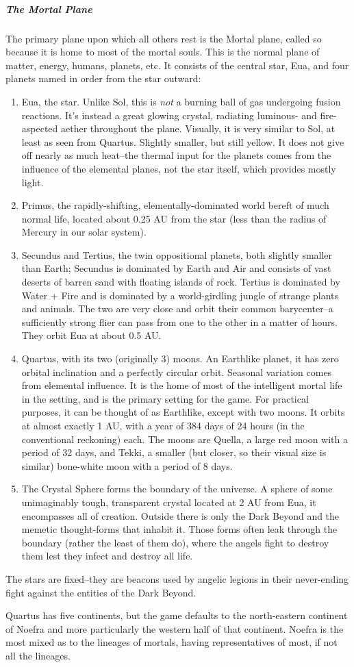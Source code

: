 \subparagraph*{The Mortal Plane}
The primary plane upon which all others rest is the Mortal plane, called so because it is home to most of the mortal souls. This is the normal plane of matter, energy, humans, planets, etc. It consists of the central star, Eua, and four planets named in order from the star outward:
\begin{enumerate}
	\item Eua, the star. Unlike Sol, this is \textit{not} a burning ball of gas undergoing fusion reactions. It's instead a great glowing crystal, radiating luminous- and fire-aspected aether throughout the plane. Visually, it is very similar to Sol, at least as seen from Quartus. Slightly smaller, but still yellow. It does not give off nearly as much heat--the thermal input for the planets comes from the influence of the elemental planes, not the star itself, which provides mostly light.
	\item Primus, the rapidly-shifting, elementally-dominated world bereft of much normal life, located about 0.25 AU from the star (less than the radius of Mercury in our solar system).
	\item Secundus and Tertius, the twin oppositional planets, both slightly smaller than Earth; Secundus is dominated by Earth and Air and consists of vast deserts of barren sand with floating islands of rock. Tertius is dominated by Water + Fire and is dominated by a world-girdling jungle of strange plants and animals. The two are very close and orbit their common barycenter--a sufficiently strong flier can pass from one to the other in a matter of hours. They orbit Eua at about 0.5 AU.
	\item Quartus, with its two (originally 3) moons. An Earthlike planet, it has zero orbital inclination and a perfectly circular orbit. Seasonal variation comes from elemental influence. It is the home of most of the intelligent mortal life in the setting, and is the primary setting for the game. For practical purposes, it can be thought of as Earthlike, except with two moons. It orbits at almost exactly 1 AU, with a year of 384 days of 24 hours (in the conventional reckoning) each. The moons are Quella, a large red moon with a period of 32 days, and Tekki, a smaller (but closer, so their visual size is similar) bone-white moon with a period of 8 days.
	\item The Crystal Sphere forms the boundary of the universe. A sphere of some unimaginably tough, transparent crystal located at 2 AU from Eua, it encompasses all of creation. Outside there is only the Dark Beyond and the memetic thought-forms that inhabit it. Those forms often leak through the boundary (rather the least of them do), where the angels fight to destroy them lest they infect and destroy all life.
\end{enumerate}

The stars are  fixed--they are beacons used by angelic legions in their never-ending fight against the entities of the Dark Beyond.

Quartus has five continents, but the game defaults to the north-eastern continent of Noefra and more particularly the western half of that continent. Noefra is the most mixed as to the lineages of mortals, having representatives of most, if not all the lineages.

